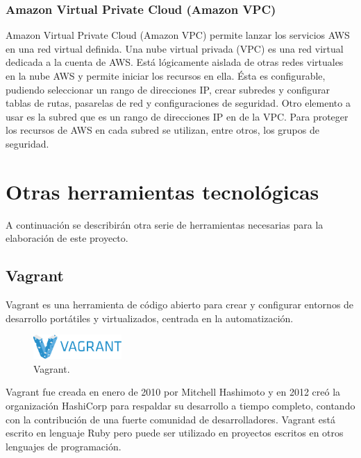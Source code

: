 \subsubsection{Amazon Virtual Private Cloud (Amazon VPC)}

Amazon Virtual Private Cloud (Amazon VPC) permite lanzar los servicios AWS en una red virtual definida. Una nube virtual privada (VPC) es una red virtual dedicada a la cuenta de AWS. Está lógicamente aislada de otras redes virtuales en la nube AWS y permite iniciar los recursos en ella. Ésta es configurable, pudiendo seleccionar un rango de direcciones IP, crear subredes y configurar tablas de rutas, pasarelas de red y configuraciones de seguridad. Otro elemento a usar es la subred que es un rango de direcciones IP en de la VPC. Para proteger los recursos de AWS en cada subred se utilizan, entre otros, los grupos de seguridad.

\section{Otras herramientas tecnológicas}

A continuación se describirán otra serie de herramientas necesarias para la elaboración de este proyecto.

\subsection{Vagrant}

Vagrant es una herramienta de código abierto para crear y configurar entornos de desarrollo portátiles y virtualizados, centrada en la automatización.

\begin{figure}[H]
\centering
\includegraphics[width=0.3\textwidth]{images/figures/vagrant.png}
\caption{Vagrant.\label{fig:figure_placement_example}}
\end{figure}

Vagrant fue creada en enero de 2010 por Mitchell Hashimoto y en 2012 creó la organización HashiCorp para respaldar su desarrollo a tiempo completo, contando con la contribución de una fuerte comunidad de desarrolladores. Vagrant está escrito en lenguaje Ruby pero puede ser utilizado en proyectos escritos en otros lenguajes de programación.

